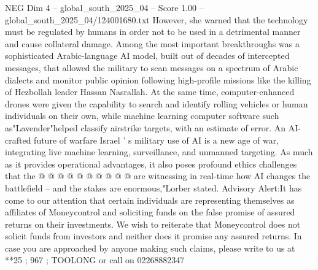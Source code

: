 \begin{textsample}{NEG Dim 4 – global\_south\_2025\_04 – Score 1.00 – global\_south\_2025\_04/124001680.txt}
However, she warned that the technology must be regulated by humans in order not to be used in a detrimental manner and cause collateral damage.
Among the most important breakthroughs was a sophisticated Arabic-language AI model, built out of decades of intercepted messages, that allowed the military to scan messages on a spectrum of Arabic dialects and monitor public opinion following high-profile missions like the killing of Hezbollah leader Hassan Nasrallah.
At the same time, computer-enhanced drones were given the capability to search and identify rolling vehicles or human individuals on their own, while machine learning computer software such as"Lavender"helped classify airstrike targets, with an estimate of error.
An AI-crafted future of warfare Israel ' s military use of AI is a new age of war, integrating live machine learning, surveillance, and unmanned targeting.
As much as it provides operational advantages, it also poses profound ethics challenges that the @ @ @ @ @ @ @ @ @ @ are witnessing in real-time how AI changes the battlefield -- and the stakes are enormous,"Lorber stated.
Advisory Alert:It has come to our attention that certain individuals are representing themselves as affiliates of Moneycontrol and soliciting funds on the false promise of assured returns on their investments.
We wish to reiterate that Moneycontrol does not solicit funds from investors and neither does it promise any assured returns.
In case you are approached by anyone making such claims, please write to us at **25 ; 967 ; TOOLONG or call on 02268882347

\end{textsample}
